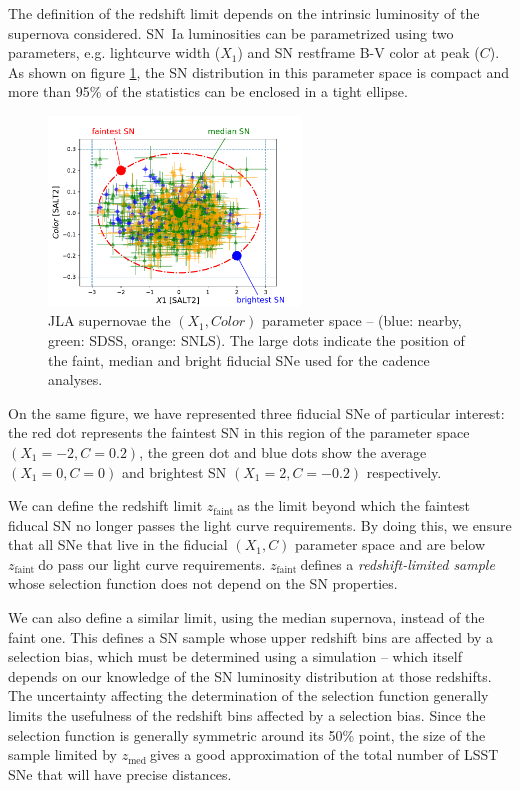 \documentclass [11pt,a4paper]{article}
\newcommand{\zfaint}{$z_{\mathrm{faint}}\ $}
\newcommand{\zmed}{$z_{\mathrm{med}}\ $}
\begin{document}
The definition of the redshift limit depends on the intrinsic
luminosity of the supernova considered.  SN~Ia luminosities can be
parametrized using two parameters, e.g. lightcurve width ($X_1$) and
SN restframe B-V color at peak ($C$).  As shown on figure
\ref{fig:jla_X1_C}, the SN distribution in this parameter space is
compact and more than 95\% of the statistics can be enclosed in a
tight ellipse. 

\begin{figure}
  \begin{center}
    \includegraphics[width=0.6\textwidth]{Figures/sn_parameter_space.pdf}
    \caption{JLA supernovae the $(X_1,Color)$ parameter space --
      (blue: nearby, green: SDSS, orange: SNLS).  The large dots
      indicate the position of the faint, median and bright fiducial
      SNe used for the cadence analyses.}
    \label{fig:jla_X1_C}
  \end{center}
\end{figure}

On the same figure, we have represented three fiducial SNe of
particular interest: the red dot represents the faintest SN in this
region of the parameter space $(X_1=-2, C=0.2)$, the green dot and
blue dots show the average $(X_1=0, C=0)$ and brightest SN $(X_1=2,
C=-0.2)$ respectively.

We can define the redshift limit \zfaint as the limit beyond which the
faintest fiducal SN no longer passes the light curve requirements. By
doing this, we ensure that all SNe that live in the fiducial $(X_1,C)$
parameter space and are below \zfaint do pass our light curve
requirements.  \zfaint defines a {\em redshift-limited sample} whose
selection function does not depend on the SN properties.

We can also define a similar limit, using the median supernova,
instead of the faint one.  This defines a SN sample whose upper
redshift bins are affected by a selection bias, which must be
determined using a simulation -- which itself depends on our knowledge
of the SN luminosity distribution at those redshifts.  The uncertainty
affecting the determination of the selection function generally limits
the usefulness of the redshift bins affected by a selection bias.
Since the selection function is generally symmetric around its 50\%
point, the size of the sample limited by \zmed gives a good
approximation of the total number of LSST SNe that will have precise
distances.
\end{document}

